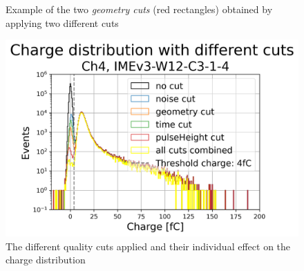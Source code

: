 \begin{figure}[h!tbp]
    \centering
    \hfill
    \centering
    \caption{Example of the two \textit{geometry cuts} (red rectangles) obtained by applying two different cuts}
    \label{fig:geometry_cut_comparison}
\end{figure}

\begin{figure}[h!tbp]
    \centering
    \includegraphics[width=0.7\linewidth]{Images/appendix/Charge_distribution_different_cuts_batch_401_S1_DUTs_3.png}
    \caption{The different quality cuts applied and their individual effect on the charge distribution}
    \label{fig:charge_plot_all_cuts}
\end{figure}